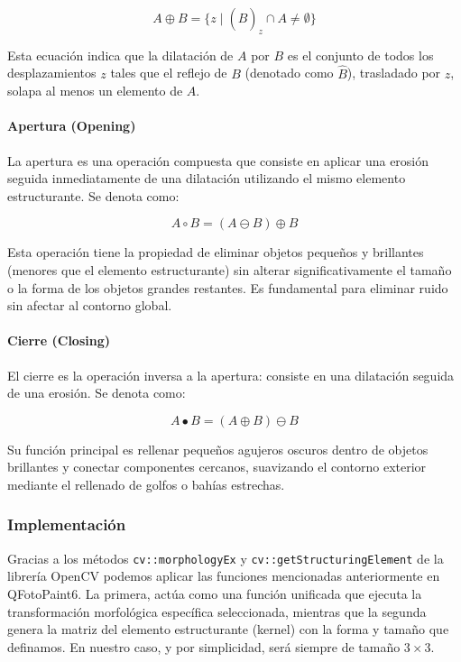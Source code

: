 \documentclass[11pt]{article}
\begin{document}
              \[ A \oplus B = \{ z \mid (\hat{B})_z \cap A \neq \emptyset \} \]

              Esta ecuación indica que la dilatación de \( A \) por \( B \) es el conjunto de
              todos los desplazamientos \( z \) tales que el reflejo de \( B \) (denotado
              como \( \hat{B} \)), trasladado por \( z \), solapa al menos un elemento de \(
              A \).

              \clearpage

          \paragraph*{Apertura (Opening)} La apertura es una operación compuesta que consiste
              en aplicar una erosión seguida inmediatamente de una dilatación utilizando el
              mismo elemento estructurante. Se denota como:

              \[ A \circ B = (A \ominus B) \oplus B \]

              Esta operación tiene la propiedad de eliminar objetos pequeños y brillantes
              (menores que el elemento estructurante) sin alterar significativamente el
              tamaño o la forma de los objetos grandes restantes. Es fundamental para
              eliminar ruido sin afectar al contorno global.

          \paragraph*{Cierre (Closing)} El cierre es la operación inversa a la apertura:
              consiste en una dilatación seguida de una erosión. Se denota como:

              \[ A \bullet B = (A \oplus B) \ominus B \]

              Su función principal es rellenar pequeños agujeros oscuros dentro de objetos
              brillantes y conectar componentes cercanos, suavizando el contorno exterior
              mediante el rellenado de golfos o bahías estrechas.

      \subsubsection{Implementación}

          \noindent
          Gracias a los métodos \texttt{cv::morphologyEx} y \texttt{cv::getStructuringElement} de la librería OpenCV podemos aplicar las funciones mencionadas anteriormente en QFotoPaint6. La primera, actúa como una función unificada que ejecuta la transformación morfológica específica seleccionada, mientras que la segunda genera la matriz del elemento estructurante (kernel) con la forma y tamaño que definamos. En nuestro caso, y por simplicidad, será siempre de tamaño \(3 \times 3\).  \\
\end{document}
